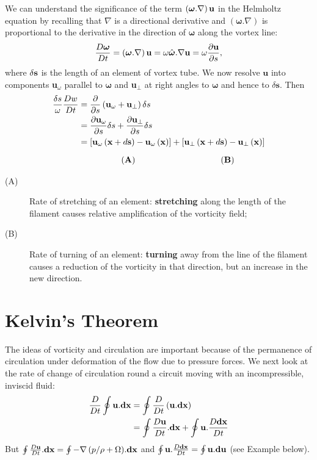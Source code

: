 \documentclass[twoside,a4paper,11pt]{report}
\begin{document}
We can understand the significance of the term $\left( {{\bm\omega}. \nabla } 
\right){{\bf u}}$ in the Helmholtz equation by recalling that $\nabla $ 
is a directional derivative and $({\bm\omega}.  \nabla )$ is 
proportional to the derivative in the direction of ${\bm\omega}$ along 
the vortex line:
\[
\frac{D{\bm\omega}}{Dt}=\left( {{\bm\omega}. \nabla } \right){{\bf u}}=\omega \hat 
{{\bm\omega}}. \nabla {{\bf u}}=\omega \frac{\partial {{\bf u}}}{\partial 
s},
\]
where $\delta {\bf s}$ is the length of an element of vortex tube. We now resolve 
$\textbf{u}$ into components \textbf{u}$_{\omega }$ parallel to ${\bm\omega}$
 and \textbf{u}$_{\bot }$ at right angles to 
${\bm\omega}$ and hence to $\delta \textbf{s}$. Then 
\begin{align*}
 \frac{\delta s}{\omega }\frac{Dw}{Dt} &=\frac{\partial }{\partial 
s}\left( {{{\bf u}}_\omega +{{\bf u}}_\bot } \right)\delta s  \\
 & =\frac{\partial {{\bf u}}_\omega }{\partial 
s}\delta s+\frac{\partial {{\bf u}}_\bot }{\partial s}\delta s \\ 
& =\left[ {{{\bf u}}_\omega \left( {{{\bf 
x}}+d{{\bf s}}} \right)-{{\bf u}}_\omega \left( {{\bf x}} 
\right)} \right]+\left[ {{{\bf u}}_\bot \left( {{{\bf x}}+d{{\bf 
s}}} \right)-{{\bf u}}_\bot \left( {{\bf x}} \right)} \right] \\ 
\noalign{\medskip}
& \qquad \qquad \quad{\bf (A)} \qquad \qquad \qquad \qquad \qquad {\bf (B)}
 \end{align*}
\begin{description}
\item[(A)] Rate of stretching of an element: \textbf{stretching} along the
length of the filament causes relative amplification of the vorticity field;
\item[(B)] Rate of turning of an element: \textbf{turning} away from the line
of the filament causes a reduction of the vorticity in that direction, but an
increase in the new direction.
\end{description}

\section{Kelvin's Theorem}
The ideas of vorticity and circulation are important because of the 
permanence of circulation under deformation of the flow due to pressure 
forces. We next look at the rate of change of circulation round a circuit 
moving with an incompressible, inviscid fluid:
\begin{align*}
 \frac{D}{Dt}\oint {{{\bf u}}. {{\bf dx}}} & =\oint 
{\frac{D}{Dt}\left( {{{\bf u}}. {{\bf dx}}} \right)} \\ 
&  =\oint {\frac{D{{\bf u}}}{Dt}. 
{{\bf dx}}} +\oint {{{\bf u}}. \frac{D{{\bf 
dx}}}{Dt}} \\ 
 \end{align*}
 But $\oint {\frac{D{{\bf u}}}{Dt}. {{\bf dx}}} =\oint {-\nabla 
\left( {p/  {\rho +\Omega }} \right)} . {{\bf dx}}$ 
and $\oint {{{\bf u}}. \frac{D{{\bf dx}}}{Dt}} =\oint 
{{{\bf u}}. {{\bf du}}} $ (see Example below).
\end{document}
